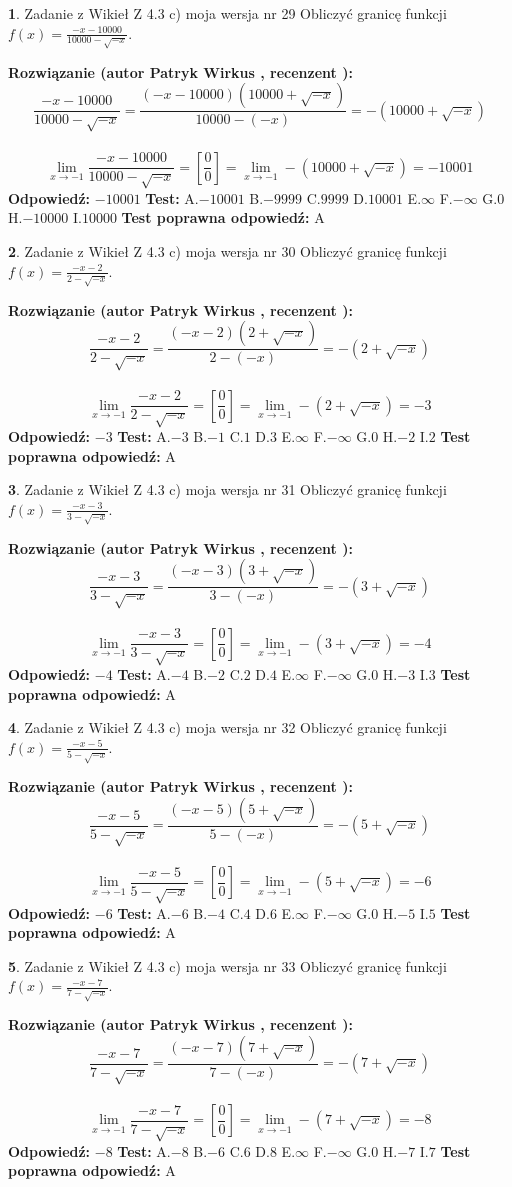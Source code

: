 \documentclass[12pt, a4paper]{article}
\theoremstyle{definition} %
\newtheorem{zad}{}
\newcommand{\zadStart}[1]{\begin{zad}#1\newline}
\newcommand{\zadStop}{\end{zad}}
\newcommand{\rozwStart}[2]{\noindent \textbf{Rozwiązanie (autor #1 , recenzent #2): }\newline}
\newcommand{\rozwStop}{\newline}
\newcommand{\odpStart}{\noindent \textbf{Odpowiedź:}\newline}
\newcommand{\odpStop}{\newline}
\newcommand{\testStart}{\noindent \textbf{Test:}\newline}
\newcommand{\testStop}{\newline}
\newcommand{\kluczStart}{\noindent \textbf{Test poprawna odpowiedź:}\newline}
\newcommand{\kluczStop}{\newline}
\begin{document}
\zadStart{Zadanie z Wikieł Z 4.3 c) moja wersja nr 29}
Obliczyć granicę funkcji $f(x)=\frac{-x-10000}{10000-\sqrt{-x}}$.
\zadStop
\rozwStart{Patryk Wirkus}{}
$$\frac{-x-10000}{10000-\sqrt{-x}}=\frac{(-x-10000)(10000+\sqrt{-x})}{10000-(-x)}=-(10000+\sqrt{-x})$$
\\
$$\lim\limits_{x\to-1}\frac{-x-10000}{10000-\sqrt{-x}}=[\frac{0}{0}]=\lim\limits_{x\to-1}-(10000+\sqrt{-x}) =-10001$$
\rozwStop
\odpStart
$-10001$
\odpStop
\testStart
A.$-10001$
B.$-9999$
C.$9999$
D.$10001$
E.$\infty$
F.$-\infty$
G.$0$
H.$-10000$
I.$10000$
\testStop
\kluczStart
A
\kluczStop



\zadStart{Zadanie z Wikieł Z 4.3 c) moja wersja nr 30}
Obliczyć granicę funkcji $f(x)=\frac{-x-2}{2-\sqrt{-x}}$.
\zadStop
\rozwStart{Patryk Wirkus}{}
$$\frac{-x-2}{2-\sqrt{-x}}=\frac{(-x-2)(2+\sqrt{-x})}{2-(-x)}=-(2+\sqrt{-x})$$
\\
$$\lim\limits_{x\to-1}\frac{-x-2}{2-\sqrt{-x}}=[\frac{0}{0}]=\lim\limits_{x\to-1}-(2+\sqrt{-x}) =-3$$
\rozwStop
\odpStart
$-3$
\odpStop
\testStart
A.$-3$
B.$-1$
C.$1$
D.$3$
E.$\infty$
F.$-\infty$
G.$0$
H.$-2$
I.$2$
\testStop
\kluczStart
A
\kluczStop



\zadStart{Zadanie z Wikieł Z 4.3 c) moja wersja nr 31}
Obliczyć granicę funkcji $f(x)=\frac{-x-3}{3-\sqrt{-x}}$.
\zadStop
\rozwStart{Patryk Wirkus}{}
$$\frac{-x-3}{3-\sqrt{-x}}=\frac{(-x-3)(3+\sqrt{-x})}{3-(-x)}=-(3+\sqrt{-x})$$
\\
$$\lim\limits_{x\to-1}\frac{-x-3}{3-\sqrt{-x}}=[\frac{0}{0}]=\lim\limits_{x\to-1}-(3+\sqrt{-x}) =-4$$
\rozwStop
\odpStart
$-4$
\odpStop
\testStart
A.$-4$
B.$-2$
C.$2$
D.$4$
E.$\infty$
F.$-\infty$
G.$0$
H.$-3$
I.$3$
\testStop
\kluczStart
A
\kluczStop



\zadStart{Zadanie z Wikieł Z 4.3 c) moja wersja nr 32}
Obliczyć granicę funkcji $f(x)=\frac{-x-5}{5-\sqrt{-x}}$.
\zadStop
\rozwStart{Patryk Wirkus}{}
$$\frac{-x-5}{5-\sqrt{-x}}=\frac{(-x-5)(5+\sqrt{-x})}{5-(-x)}=-(5+\sqrt{-x})$$
\\
$$\lim\limits_{x\to-1}\frac{-x-5}{5-\sqrt{-x}}=[\frac{0}{0}]=\lim\limits_{x\to-1}-(5+\sqrt{-x}) =-6$$
\rozwStop
\odpStart
$-6$
\odpStop
\testStart
A.$-6$
B.$-4$
C.$4$
D.$6$
E.$\infty$
F.$-\infty$
G.$0$
H.$-5$
I.$5$
\testStop
\kluczStart
A
\kluczStop



\zadStart{Zadanie z Wikieł Z 4.3 c) moja wersja nr 33}
Obliczyć granicę funkcji $f(x)=\frac{-x-7}{7-\sqrt{-x}}$.
\zadStop
\rozwStart{Patryk Wirkus}{}
$$\frac{-x-7}{7-\sqrt{-x}}=\frac{(-x-7)(7+\sqrt{-x})}{7-(-x)}=-(7+\sqrt{-x})$$
\\
$$\lim\limits_{x\to-1}\frac{-x-7}{7-\sqrt{-x}}=[\frac{0}{0}]=\lim\limits_{x\to-1}-(7+\sqrt{-x}) =-8$$
\rozwStop
\odpStart
$-8$
\odpStop
\testStart
A.$-8$
B.$-6$
C.$6$
D.$8$
E.$\infty$
F.$-\infty$
G.$0$
H.$-7$
I.$7$
\testStop
\kluczStart
A
\kluczStop
\end{document}
